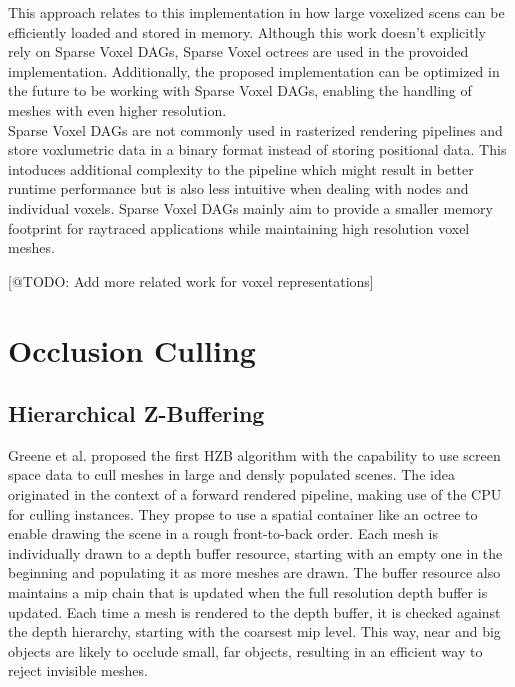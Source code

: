 \noindent
This approach relates to this implementation in how large voxelized scens can be efficiently loaded and stored in 
memory. Although this work doesn't explicitly rely on Sparse Voxel \ac{DAG}s, Sparse Voxel octrees are used in the 
provoided implementation. Additionally, the proposed implementation can be optimized in the future to be working 
with Sparse Voxel \ac{DAG}s, enabling the handling of meshes with even higher resolution. \\

\noindent
Sparse Voxel \ac{DAG}s are not commonly used in rasterized rendering pipelines and store voxlumetric data in a binary 
format instead of storing positional data. This intoduces additional complexity to the pipeline which might result in 
better runtime performance but is also less intuitive when dealing with nodes and individual voxels. Sparse Voxel 
\ac{DAG}s mainly aim to provide a smaller memory footprint for raytraced applications while maintaining high resolution 
voxel meshes.


[@TODO: Add more related work for voxel representations]

\section{Occlusion Culling}


\subsection*{Hierarchical Z-Buffering}

Greene et al. \cite{Greene93,Greene95} proposed the first \ac{HZB} algorithm with the capability to use screen space 
data to cull meshes in large and densly populated scenes. The idea originated in the context of a forward rendered 
pipeline, making use of the \ac{CPU} for culling instances. They propse to use a spatial container like an octree to 
enable drawing the scene in a rough front-to-back order. Each mesh is individually drawn to a depth buffer resource, 
starting with an empty one in the beginning and populating it as more meshes are drawn. The buffer resource also 
maintains a mip chain that is updated when the full resolution depth buffer is updated. Each time a mesh is rendered 
to the depth buffer, it is checked against the depth hierarchy, starting with the coarsest mip level. This way, near 
and big objects are likely to occlude small, far objects, resulting in an efficient way to reject invisible meshes.\\

